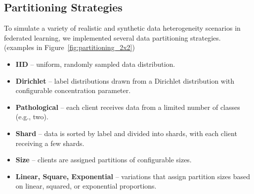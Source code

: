 \documentclass[11pt]{article}
\begin{document}
    \subsection{Partitioning Strategies}
    \label{subsec:partitioning}

    To simulate a variety of realistic and synthetic data heterogeneity scenarios in federated learning, we implemented several data partitioning strategies. (examples in Figure~\ref{fig:partitioning_2x2})

    \begin{itemize}
        \item \textbf{IID} – uniform, randomly sampled data distribution.
        \item \textbf{Dirichlet} – label distributions drawn from a Dirichlet distribution with configurable concentration parameter.
        \item \textbf{Pathological} – each client receives data from a limited number of classes (e.g., two).
        \item \textbf{Shard} – data is sorted by label and divided into shards, with each client receiving a few shards.
        \item \textbf{Size} – clients are assigned partitions of configurable sizes.
        \item \textbf{Linear, Square, Exponential} – variations that assign partition sizes based on linear, squared, or exponential proportions.
    \end{itemize}
\end{document}
